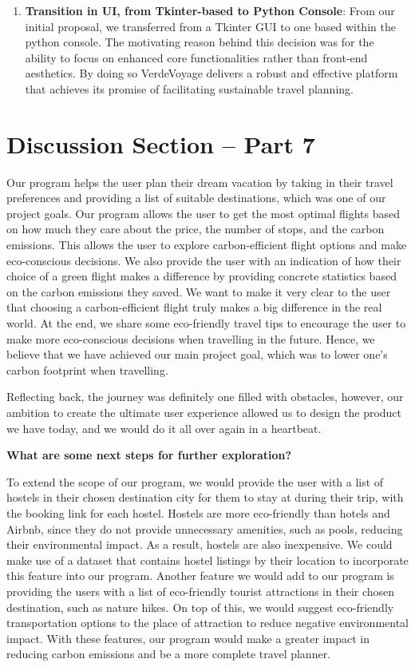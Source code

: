 \documentclass[11pt]{article}
\begin{document}
\begin{enumerate}
    \item \textbf{Transition in UI, from Tkinter-based to Python Console}: From our initial proposal, we transferred from a Tkinter GUI to one based within the python console. The motivating reason behind this decision was for the ability to focus on enhanced core functionalities rather than front-end aesthetics. By doing so VerdeVoyage delivers a robust and effective platform that achieves its promise of facilitating sustainable travel planning.
\end{enumerate}

\section*{Discussion Section -- Part 7}

\noindent Our program helps the user plan their dream vacation by taking in their travel preferences and providing a list of suitable destinations, which was one of our project goals. Our program allows the user to get the most optimal flights based on how much they care about the price, the number of stops, and the carbon emissions. This allows the user to explore carbon-efficient flight options and make eco-conscious decisions. We also provide the user with an indication of how their choice of a green flight makes a difference by providing concrete statistics based on the carbon emissions they saved. We want to make it very clear to the user that choosing a carbon-efficient flight truly makes a big difference in the real world. At the end, we share some eco-friendly travel tips to encourage the user to make more eco-conscious decisions when travelling in the future. Hence, we believe that we have achieved our main project goal, which was to lower one’s carbon footprint when travelling.

\medskip

\noindent Reflecting back, the journey was definitely one filled with obstacles, however, our ambition to create the ultimate user experience allowed us to design the product we have today, and we would do it all over again in a heartbeat.

\medskip

\noindent \textbf{What are some next steps for further exploration?}

\noindent To extend the scope of our program, we would provide the user with a list of hostels in their chosen destination city for them to stay at during their trip, with the booking link for each hostel. Hostels are more eco-friendly than hotels and Airbnb, since they do not provide unnecessary amenities, such as pools, reducing their environmental impact. As a result, hostels are also inexpensive. We could make use of a dataset that contains hostel listings by their location to incorporate this feature into our program. Another feature we would add to our program is providing the users with a list of eco-friendly tourist attractions in their chosen destination, such as nature hikes. On top of this, we would suggest eco-friendly transportation options to the place of attraction to reduce negative environmental impact. With these features, our program would make a greater impact in reducing carbon emissions and be a more complete travel planner.
\end{document}
